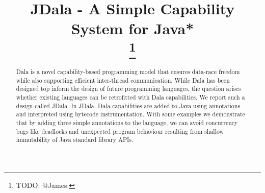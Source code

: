 \documentclass[conference]{IEEEtran}
\newcommand{\dala}{Dala\xspace}
\newcommand{\jdala}{JDala\xspace}
\begin{document}
	
	

\title{JDala - A Simple Capability System for Java*\\
\thanks{TODO: @James.}
}

\author{
\and
{}
\and
{}
\and
{}
\and
{}
}

\maketitle

\begin{abstract}


\dala is a novel capability-based programming model that ensures data-race freedom while also supporting efficient inter-thread communication. While \dala has been designed top inform the design of future programming languages, the question arises whether existing languages can be retrofitted with \dala capabilities. We report such a design called \jdala. In \jdala,  \dala capabilities are added to Java using annotations and interpreted using bytecode instrumentation. With some examples we demonstrate that by adding three simple annotations to the language, we can avoid concurrency bugs like deadlocks and unexpected program behaviour resulting from shallow immutability of Java standard library APIs. 

\end{abstract}
\end{document}
